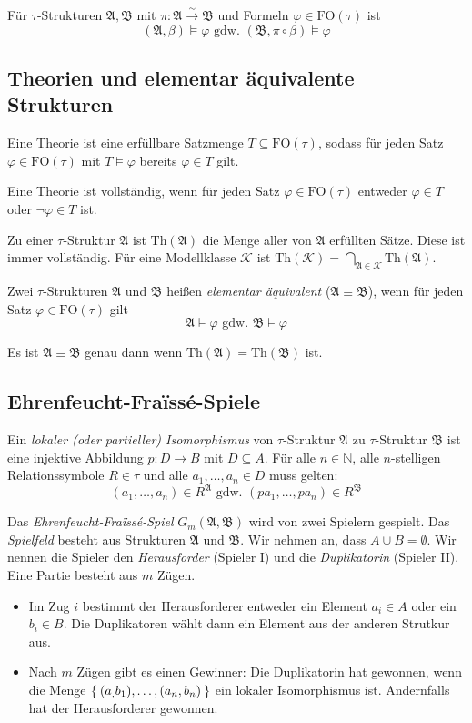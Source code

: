 \documentclass[a4paper,parskip=half*,DIV=15,fontsize=11pt]{scrartcl}
\newcommand{\A}{\mathfrak{A}}
\newcommand{\B}{\mathfrak{B}}
\newcommand{\FO}{\mathrm{FO}}
\newcommand{\isoTo}{\overset{\sim}{\to}}
\newcommand{\Th}{\mathrm{Th}}
\newcommand{\K}{\mathcal{K}}
\begin{document}
Für $\tau$-Strukturen $\A, \B$ mit $\pi : \A \isoTo \B$ und Formeln $\varphi \in \FO(\tau)$ ist
\[(\A, \beta) \models \varphi \text{ gdw.\ } (\B, \pi \circ \beta) \models \varphi\]

\subsection{Theorien und elementar äquivalente Strukturen}

Eine Theorie ist eine erfüllbare Satzmenge $T \subseteq \FO(\tau)$, sodass für jeden Satz $\varphi \in \FO(\tau)$ mit $T \models \varphi$ bereits $\varphi \in T$ gilt.

Eine Theorie ist vollständig, wenn für jeden Satz $\varphi \in \FO(\tau)$ entweder $\varphi \in T$ oder $\neg \varphi \in T$ ist.

Zu einer $\tau$-Struktur $\A$ ist $\Th(\A)$ die Menge aller von $\A$ erfüllten Sätze. Diese ist immer vollständig.
Für eine Modellklasse $\K$ ist $\Th(\K) = \bigcap_{\A \in \K} \Th(\A)$.

Zwei $\tau$-Strukturen $\A$ und $\B$ heißen \emph{elementar äquivalent} ($\A \equiv \B$), wenn für jeden Satz $\varphi \in \FO(\tau)$ gilt
\[\A \models \varphi \text{ gdw. } \B \models \varphi\]

Es ist $\A \equiv \B$ genau dann wenn $\Th(\A) = \Th(\B)$ ist.

\subsection{Ehrenfeucht-Fra\"issé-Spiele}

Ein \emph{lokaler (oder partieller) Isomorphismus} von $\tau$-Struktur $\A$ zu $\tau$-Struktur $\B$ ist eine injektive Abbildung $p : D \to B$ mit $D \subseteq A$. Für alle $n \in \mathbb{N}$, alle $n$-stelligen Relationssymbole $R \in \tau$ und alle $a_1, \ldots, a_n \in D$ muss gelten:
\[ (a_1, \ldots, a_n) \in R^\A \text{ gdw. } (p a_1, \ldots, p a_n) \in R^\B \]

Das \emph{Ehrenfeucht-Fra\"issé-Spiel} $G_m(\A, \B)$ wird von zwei Spielern gespielt. Das \emph{Spielfeld} besteht aus Strukturen $\A$ und $\B$. Wir nehmen an, dass $A \cup B = \emptyset$. Wir nennen die Spieler den \emph{Herausforder} (Spieler I) und die \emph{Duplikatorin} (Spieler II). Eine Partie besteht aus $m$ Zügen.

\begin{itemize}
  \item Im Zug $i$ bestimmt der Herausforderer entweder ein Element $a_i \in A$ oder ein $b_i \in B$. Die Duplikatoren wählt dann ein Element aus der anderen Strutkur aus.
  \item Nach $m$ Zügen gibt es einen Gewinner: Die Duplikatorin hat gewonnen, wenn die Menge $\Set{(a_,b_1), \ldots,  (a_n, b_n)}$ ein lokaler Isomorphismus ist. Andernfalls hat der Herausforderer gewonnen.
\end{itemize}
\end{document}
